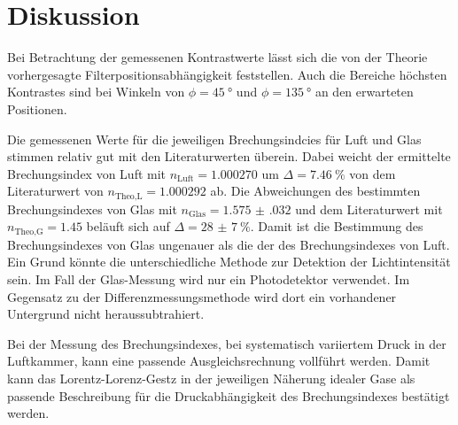 \section{Diskussion}
\label{sec:Diskussion}


Bei Betrachtung der gemessenen Kontrastwerte lässt sich die von der Theorie vorhergesagte Filterpositionsabhängigkeit feststellen. 
Auch die Bereiche höchsten Kontrastes sind bei Winkeln von $\phi = \SI{45}{\degree}$ und $\phi = \SI{135}{\degree}$ an den erwarteten Positionen.


Die gemessenen Werte für die jeweiligen Brechungsindcies für Luft und Glas stimmen relativ gut mit den Literaturwerten überein.
Dabei weicht der ermittelte Brechungsindex von Luft mit $n_\text{Luft} = \num{1.000270}$ um $\Delta = \SI{7.46}{\percent}$ von dem Literaturwert \cite{Dem2} von $n_\text{Theo,L} = \num{1.000292}$ ab.
Die Abweichungen des bestimmten Brechungsindexes von Glas mit $n_\text{Glas} = \num{1.575(032)}$ und dem Literaturwert \cite{Dem2} mit $n_\text{Theo,G} = \num{1.45}$ beläuft sich auf $\Delta = \SI{28(7)}{\percent}$.
Damit ist die Bestimmung des Brechungsindexes von Glas ungenauer als die der des Brechungsindexes von Luft. 
Ein Grund könnte die unterschiedliche Methode zur Detektion der Lichtintensität sein. 
Im Fall der Glas-Messung wird nur ein Photodetektor verwendet. 
Im Gegensatz zu der Differenzmessungsmethode wird dort ein vorhandener Untergrund nicht heraussubtrahiert.


Bei der Messung des Brechungsindexes, bei systematisch variiertem Druck in der Luftkammer, kann eine passende Ausgleichsrechnung vollführt werden. 
Damit kann das Lorentz-Lorenz-Gestz in der jeweiligen Näherung idealer Gase als passende Beschreibung für die Druckabhängigkeit des Brechungsindexes bestätigt werden.



